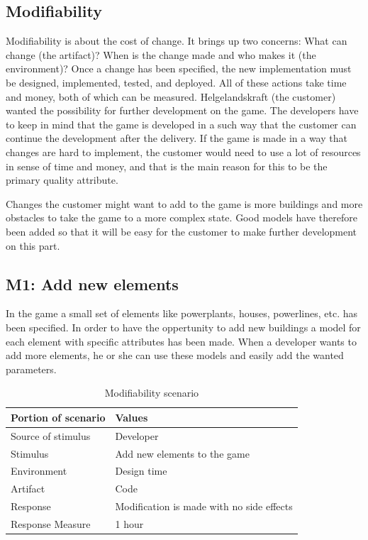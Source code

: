 \subsection{Modifiability}

Modifiability \cite{attributes} is about the cost of change. It brings up two concerns: 
What can change (the artifact)? 
When is the change made and who makes it (the environment)? 
Once a change has been specified, the new implementation must be designed, 
implemented, tested, and deployed. All of these actions take time and money, both of which can be measured.
Helgelandskraft (the customer) wanted the possibility for further development on the game. The developers
have to keep in mind that the game is developed in a such way that the customer can continue
the development after the delivery. If the game is made in a way that changes are hard to implement, 
the customer would need to use a lot of resources in sense of time and money, and that is the main 
reason for this to be the primary quality attribute.

Changes the customer might want to add to the game is more buildings and more obstacles to take
the game to a more complex state. Good models have therefore been added so that it will be easy for 
the customer to make further development on this part.

\subsection*{M1: Add new elements}
In the game a small set of elements like powerplants, houses, powerlines, etc. has been specified.
In order to have the oppertunity to add new buildings a model for each element with specific attributes has been made. When a developer wants to add more elements, he or she can use these models and easily add the wanted parameters. 

\begin{table}[H]
\begin{tabular}{| l | l |}
	\hline
	\rowcolor{gray}
	{\bf Portion of scenario} & {\bf Values} \\ \hline
	Source of stimulus & Developer\\ \hline
	Stimulus & Add new elements to the game\\ \hline
	Environment & Design time \\ \hline
	Artifact & Code \\ \hline
	Response & Modification is made with no side effects\\ \hline
	Response Measure & 1 hour\\ \hline
\end{tabular}
\caption{Modifiability scenario}
\end{table}


